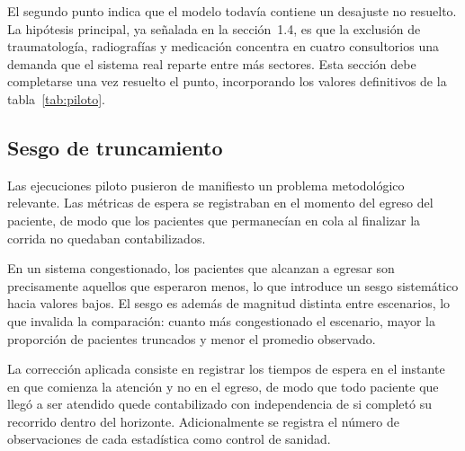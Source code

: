 \begin{pendiente}
El segundo punto indica que el modelo todavía contiene un desajuste no
resuelto. La hipótesis principal, ya señalada en la sección~1.4, es que la
exclusión de traumatología, radiografías y medicación concentra en cuatro
consultorios una demanda que el sistema real reparte entre más sectores. Esta
sección debe completarse una vez resuelto el punto, incorporando los valores
definitivos de la tabla~\ref{tab:piloto}.
\end{pendiente}

\subsection{Sesgo de truncamiento}

Las ejecuciones piloto pusieron de manifiesto un problema metodológico
relevante. Las métricas de espera se registraban en el momento del egreso del
paciente, de modo que los pacientes que permanecían en cola al finalizar la
corrida no quedaban contabilizados.

En un sistema congestionado, los pacientes que alcanzan a egresar son
precisamente aquellos que esperaron menos, lo que introduce un sesgo
sistemático hacia valores bajos. El sesgo es además de magnitud distinta
entre escenarios, lo que invalida la comparación: cuanto más congestionado el
escenario, mayor la proporción de pacientes truncados y menor el promedio
observado.

La corrección aplicada consiste en registrar los tiempos de espera en el
instante en que comienza la atención y no en el egreso, de modo que todo
paciente que llegó a ser atendido quede contabilizado con independencia de si
completó su recorrido dentro del horizonte. Adicionalmente se registra el
número de observaciones de cada estadística como control de sanidad.

